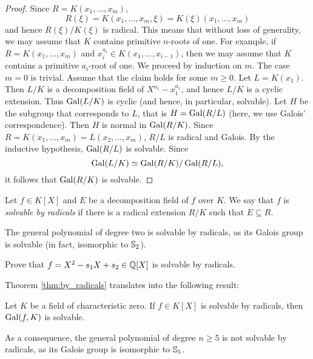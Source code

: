 \begin{proof}
    Since
    $R=K(x_1,\dots,x_m)$,  
    \[
    R(\xi)=K(x_1,\dots,x_m,\xi)=K(\xi)(x_1,\dots,x_m)
    \]
    and hence $R(\xi)/K(\xi)$ is radical. 
    This means that
    without loss of generality, we may assume that
    $K$ contains primitive $n$-roots of one. For example, 
    if $R=K(x_1,\dots,x_m)$ and $x_i^{a_i}\in K(x_1,\dots,x_{i-1})$, 
    then we may assume that $K$ contains a primitive $a_i$-root of one. We proceed by induction on $m$. 
    The case $m=0$ is trivial. Assume that the claim holds for some $m\geq0$. Let 
    $L=K(x_1)$. Then $L/K$ is a decomposition field of $X^{a_1}-x_1^{a_1}$, and hence
    $L/K$ is a cyclic extension. Thus $\operatorname{Gal}(L/K)$ is cyclic (and hence, in particular, solvable). 
    Let $H$ be the subgroup that corresponds to $L$, that is
    $H=\operatorname{Gal}(R/L)$ (here, we use Galois' correspondence). Then $H$ is normal in $\operatorname{Gal}(R/K)$. 
    Since $R=K(x_1,\dots,x_m)=L(x_2,\dots,x_m)$, $R/L$ is radical and Galois. By the inductive hypothesis, 
    $\operatorname{Gal}(R/L)$ is solvable. Since 
    \[
    \operatorname{Gal}(L/K)\simeq \operatorname{Gal}(R/K)/\operatorname{Gal}(R/L),
    \]
    it follows that $\operatorname{Gal}(R/K)$ is solvable. 
\end{proof}

\begin{definition}
    Let $f\in K[X]$ and $E$ be a decomposition field of $f$ over $K$. 
    We say that $f$ is \emph{solvable by radicals} if
    there is a radical extension $R/K$ such that $E\subseteq R$. 
\end{definition}

The general polynomial of degree two 
is solvable by radicals, as its Galois group 
is solvable (in fact, isomorphic to $\mathbb{S}_2$).  

\begin{exercise}
    Prove that $f=X^2-s_1X+s_2\in\mathbb{Q}[X]$ is solvable by radicals. 
\end{exercise}

Theorem \ref{thm:by_radicals} translates into the following result:

\begin{exercise}
    Let $K$ be a field of characteristic zero. 
    If $f\in K[X]$ is solvable by radicals, then $\operatorname{Gal}(f,K)$ is solvable. 
\end{exercise}

As a consequence, the general polynomial of degree $n\geq5$ 
is not solvable by radicals, as its Galois group is isomorphic to 
$\mathbb{S}_5$. 

